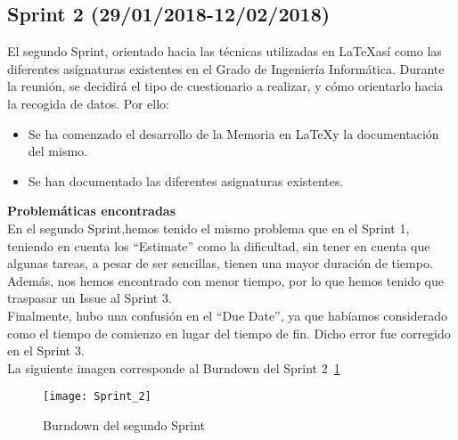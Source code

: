 \subsection{\textbf{Sprint 2}  (29/01/2018-12/02/2018) }
El segundo Sprint, orientado hacia las técnicas utilizadas en \LaTeX así como las diferentes asígnaturas existentes en el Grado de Ingeniería Informática. Durante la reunión, se decidirá el tipo de cuestionario a realizar, y cómo orientarlo hacia la recogida de datos.  
Por ello: 
\begin{itemize}
\item Se ha comenzado el desarrollo de la Memoria en \LaTeX  y la documentación del mismo. 
\item Se han documentado las diferentes asignaturas existentes. 
\end{itemize}
\textbf{Problemáticas encontradas}\\En el segundo Sprint,hemos tenido el mismo problema que en el Sprint 1, teniendo en cuenta los ``Estimate'' como la dificultad, sin tener en cuenta que algunas tareas, a pesar de ser sencillas, tienen una mayor duración de tiempo. \\Además, nos hemos encontrado con menor tiempo, por lo que hemos tenido que traspasar un Issue al Sprint 3. \\Finalmente, hubo una confusión en el ``Due Date'', ya que habíamos considerado como el tiempo de comienzo en lugar del tiempo de fin. Dicho error fue corregido en el Sprint 3. \\La siguiente imagen corresponde al Burndown del Sprint 2~\ref{fig:A.2.2}
\begin{figure}[h]
\centering
\texttt{[image: Sprint\_2]}
\caption{Burndown del segundo Sprint}
\label{fig:A.2.2}
\end{figure}
\\

